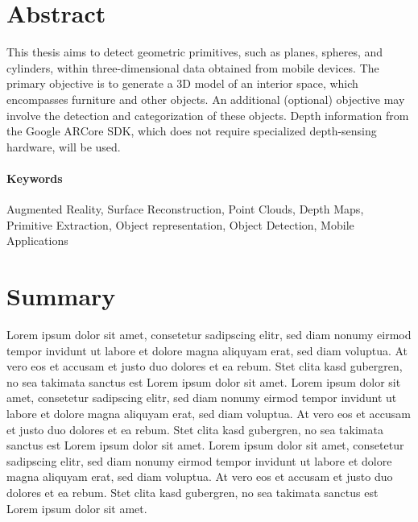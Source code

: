 
\section*{Abstract}
This thesis aims to detect geometric primitives, such as planes, spheres, and cylinders,
within three-dimensional data obtained from mobile devices.
The primary objective is to generate a 3D model of an interior space, which encompasses furniture and other objects.
An additional (optional) objective may involve the detection and categorization of these objects.
Depth information from the Google ARCore SDK, which does not require specialized depth-sensing hardware, will be used.

\paragraph*{Keywords}
Augmented Reality, Surface Reconstruction, Point Clouds, Depth Maps, Primitive Extraction, Object representation, Object Detection, Mobile Applications

\section*{Summary}
Lorem ipsum dolor sit amet, consetetur sadipscing elitr, sed diam nonumy eirmod tempor invidunt ut labore et dolore magna aliquyam erat, sed diam voluptua. At vero eos et accusam et justo duo dolores et ea rebum. Stet clita kasd gubergren, no sea takimata sanctus est Lorem ipsum dolor sit amet. Lorem ipsum dolor sit amet, consetetur sadipscing elitr, sed diam nonumy eirmod tempor invidunt ut labore et dolore magna aliquyam erat, sed diam voluptua. At vero eos et accusam et justo duo dolores et ea rebum. Stet clita kasd gubergren, no sea takimata sanctus est Lorem ipsum dolor sit amet. Lorem ipsum dolor sit amet, consetetur sadipscing elitr, sed diam nonumy eirmod tempor invidunt ut labore et dolore magna aliquyam erat, sed diam voluptua. At vero eos et accusam et justo duo dolores et ea rebum. Stet clita kasd gubergren, no sea takimata sanctus est Lorem ipsum dolor sit amet.